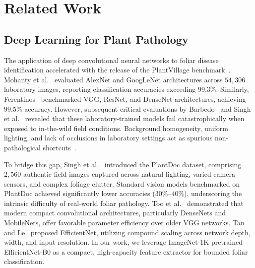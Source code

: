 \documentclass[conference,a4paper]{IEEEtran}
\begin{document}
\section{Related Work}

\subsection{Deep Learning for Plant Pathology}
The application of deep convolutional neural networks to foliar disease identification accelerated with the release of the PlantVillage benchmark~\cite{hughes2015plantvillage}. Mohanty et al.~\cite{mohanty2016deep} evaluated AlexNet and GoogLeNet architectures across $54,306$ laboratory images, reporting classification accuracies exceeding $99.3\%$. Similarly, Ferentinos~\cite{ferentinos2018deep} benchmarked VGG, ResNet, and DenseNet architectures, achieving $99.5\%$ accuracy. However, subsequent critical evaluations by Barbedo~\cite{barbedo2018impact} and Singh et al.~\cite{singh2020plantdoc} revealed that these laboratory-trained models fail catastrophically when exposed to in-the-wild field conditions. Background homogeneity, uniform lighting, and lack of occlusions in laboratory settings act as spurious non-pathological shortcuts~\cite{geirhos2020shortcut}. 

To bridge this gap, Singh et al.~\cite{singh2020plantdoc} introduced the PlantDoc dataset, comprising $2,560$ authentic field images captured across natural lighting, varied camera sensors, and complex foliage clutter. Standard vision models benchmarked on PlantDoc achieved significantly lower accuracies ($30\%\text{--}40\%$), underscoring the intrinsic difficulty of real-world foliar pathology. Too et al.~\cite{too2019comparative} demonstrated that modern compact convolutional architectures, particularly DenseNets and MobileNets, offer favorable parameter efficiency over older VGG networks. Tan and Le~\cite{tan2019efficientnet} proposed EfficientNet, utilizing compound scaling across network depth, width, and input resolution. In our work, we leverage ImageNet-1K pretrained EfficientNet-B0 as a compact, high-capacity feature extractor for bounded foliar classification.
\end{document}
